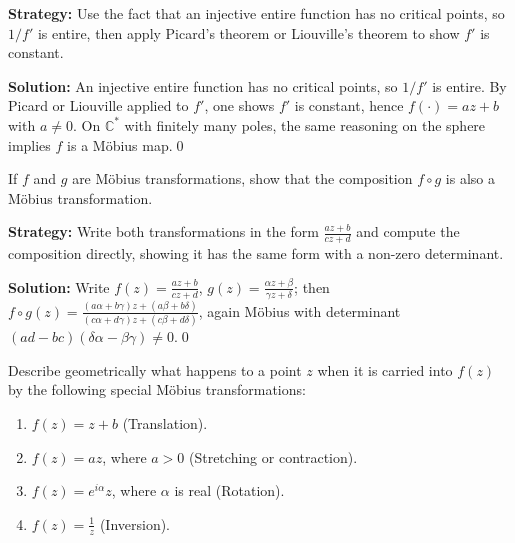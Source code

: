 \noindent\textbf{Strategy:} Use the fact that an injective entire function has no critical points, so \( 1/f' \) is entire, then apply Picard's theorem or Liouville's theorem to show \( f' \) is constant.

\bigskip\noindent\textbf{Solution:}
An injective entire function has no critical points, so $1/f'$ is entire. By Picard or Liouville applied to $f'$, one shows $f'$ is constant, hence $f(\cdot)=a z+b$ with $a\ne0$. On $\mathbb C^*$ with finitely many poles, the same reasoning on the sphere implies $f$ is a Möbius map.\qed


\begin{problembox}
\begin{problemstatement}
If \( f \) and \( g \) are Möbius transformations, show that the composition \( f \circ g \) is also a Möbius transformation.
\end{problemstatement}
\end{problembox}

\noindent\textbf{Strategy:} Write both transformations in the form \( \frac{az+b}{cz+d} \) and compute the composition directly, showing it has the same form with a non-zero determinant.

\bigskip\noindent\textbf{Solution:}
Write $f(z)=\frac{a z+b}{c z+d}$, $g(z)=\frac{\alpha z+\beta}{\gamma z+\delta}$; then \\ $f\circ g(z)=\frac{(a\alpha+b\gamma)z+(a\beta+b\delta)}{(c\alpha+d\gamma)z+(c\beta+d\delta)}$, again Möbius with determinant $(ad-bc)(\delta\alpha-\beta\gamma)\ne0$.\qed


\begin{problembox}
\begin{problemstatement}
Describe geometrically what happens to a point \( z \) when it is carried into \( f(z) \) by the following special Möbius transformations:
\begin{enumerate}[label=(\alph*)]
\item \( f(z) = z + b \) (Translation).
\item \( f(z) = a z \), where \( a > 0 \) (Stretching or contraction).
\item \( f(z) = e^{i \alpha} z \), where \( \alpha \) is real (Rotation).
\item \( f(z) = \frac{1}{z} \) (Inversion).
\end{enumerate}
\end{problemstatement}
\end{problembox}


